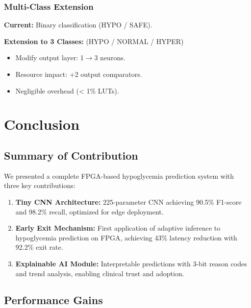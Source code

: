 \documentclass[11pt, a4paper]{article}
\begin{document}
\subsubsection{Multi-Class Extension}

\textbf{Current:} Binary classification (HYPO / SAFE).

\textbf{Extension to 3 Classes:} (HYPO / NORMAL / HYPER)
\begin{itemize}
    \item Modify output layer: 1$\to$3 neurons.
    \item Resource impact: +2 output comparators.
    \item Negligible overhead (< 1\% LUTs).
\end{itemize}

\section{Conclusion}

\subsection{Summary of Contribution}

We presented a complete FPGA-based hypoglycemia prediction system with three key contributions:

\begin{enumerate}
    \item \textbf{Tiny CNN Architecture:} 225-parameter CNN achieving 90.5\% F1-score and 98.2\% recall, optimized for edge deployment.
    
    \item \textbf{Early Exit Mechanism:} First application of adaptive inference to hypoglycemia prediction on FPGA, achieving 43\% latency reduction with 92.2\% exit rate.
    
    \item \textbf{Explainable AI Module:} Interpretable predictions with 3-bit reason codes and trend analysis, enabling clinical trust and adoption.
\end{enumerate}

\subsection{Performance Gains}
\end{document}

